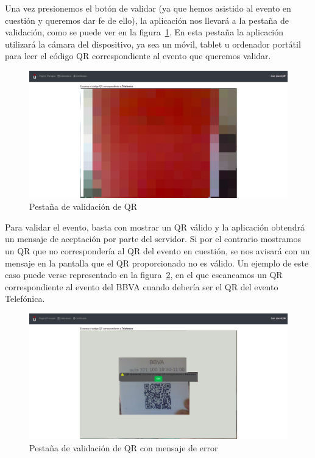 \documentclass[a4paper, 12pt]{book}
\begin{document}
\begin{enumerate}
\begin{itemize}
	Una vez presionemos el botón de validar (ya que hemos asistido al evento en cuestión y queremos dar fe de ello), la aplicación nos llevará a la pestaña de validación, como se puede ver en la figura~\ref{fig:validarQR}.
	En esta pestaña la aplicación utilizará la cámara del dispositivo, ya sea un móvil, tablet u ordenador portátil para leer el código QR correspondiente al evento que queremos validar.
	\begin{figure}[h!]
  	\centering
  	\includegraphics[width=12cm, keepaspectratio]{img/validarQR.png}
  	\caption{Pestaña de validación de QR}\label{fig:validarQR}
	\end{figure}

Para validar el evento, basta con mostrar un QR válido y la aplicación obtendrá un mensaje de aceptación por parte del servidor. Si por el contrario mostramos un QR que no correspondería al QR del evento en cuestión, se nos avisará con un mensaje en la pantalla que el QR proporcionado no es válido. Un ejemplo de este caso puede verse representado en la figura~\ref{fig:validarQRFail}, en el que escaneamos un QR correspondiente al evento del BBVA cuando debería ser el QR del evento Telefónica.

	\begin{figure}[!h]
  	\centering
  	\includegraphics[width=12cm, keepaspectratio]{img/validarQRFail.png}
  	\caption{Pestaña de validación de QR con mensaje de error}\label{fig:validarQRFail}
	\end{figure}  
	

\end{itemize}
\end{enumerate}
\end{document}
